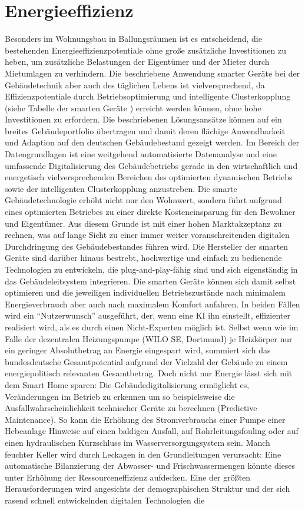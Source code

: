 \chapter{Energieeffizienz}
Besonders im Wohnungsbau in Ballungsräumen ist es entscheidend, die bestehenden Energieeffizienzpotentiale ohne große zusätzliche Investitionen zu heben, um zusätzliche Belastungen der Eigentümer und der Mieter durch Mietumlagen zu verhindern.  Die beschriebene Anwendung smarter Geräte bei der Gebäudetechnik aber auch des täglichen Lebens ist vielversprechend, da Effizienzpotentiale durch Betriebsoptimierung und intelligente Clusterkopplung (siehe Tabelle der smarten Geräte ) erreicht werden können, ohne hohe Investitionen zu erfordern. Die beschriebenen Lösungsansätze können auf ein breites Gebäudeportfolio übertragen und damit deren flächige Anwendbarkeit und Adaption auf den deutschen Gebäudebestand gezeigt werden. Im Bereich der Datengrundlagen ist eine weitgehend automatisierte Datenanalyse und eine umfassende Digitalisierung des Gebäudebetriebs gerade in den wirtschaftlich und energetisch vielversprechenden Bereichen des optimierten dynamischen Betriebs sowie der intelligenten Clusterkopplung anzustreben. Die smarte Gebäudetechnologie erhöht nicht nur den Wohnwert, sondern führt aufgrund eines optimierten Betriebes zu einer direkte Kosteneinsparung für den Bewohner und Eigentümer. Aus diesem Grunde ist mit einer hohen Marktakzeptanz zu rechnen, was auf lange Sicht zu einer immer weiter voranschreitenden digitalen Durchdringung des Gebäudebestandes führen wird. Die Hersteller der smarten Geräte sind darüber hinaus bestrebt, hochwertige und einfach zu bedienende Technologien zu entwickeln, die plug-and-play-fähig sind und sich eigenständig in das Gebäudeleitsystem integrieren. Die smarten Geräte können sich damit selbst optimieren und die jeweiligen individuellen Betriebszustände nach minimalem Energieverbrauch aber auch nach maximalem Komfort anfahren. In beiden Fällen wird ein \enquote{Nutzerwunsch} ausgeführt, der, wenn eine \gls{KI} ihn einstellt, effizienter realisiert wird, als es durch einen Nicht-Experten möglich ist. Selbst wenn wie im Falle der dezentralen Heizungspumpe (WILO SE, Dortmund) je Heizkörper nur ein geringer Absolutbetrag an Energie eingespart wird, summiert sich das bundesdeutsche Gesamtpotential aufgrund der Vielzahl der Gebäude zu einem energiepolitisch relevanten Gesamtbetrag. Doch nicht nur Energie lässt sich mit dem Smart Home sparen: Die Gebäudedigitalisierung ermöglicht es, Veränderungen im Betrieb zu erkennen um so beispielsweise die Ausfallwahrscheinlichkeit technischer Geräte zu berechnen (Predictive Maintenance). So kann die Erhöhung des Stromverbrauchs einer Pumpe einer Hebeanlage Hinweise auf einen baldigen Ausfall, auf Rohrleitungsfouling oder auf einen hydraulischen Kurzschluss im Wasserversorgungsystem sein.  Manch feuchter Keller wird durch Leckagen in den Grundleitungen verursacht: Eine automatische Bilanzierung der Abwasser- und Frischwassermengen könnte dieses unter Erhöhung der Ressourceneffizienz aufdecken.  Eine der größten Herausforderungen wird angesichts der demographischen Struktur und der sich rasend schnell entwickelnden digitalen Technologien die 